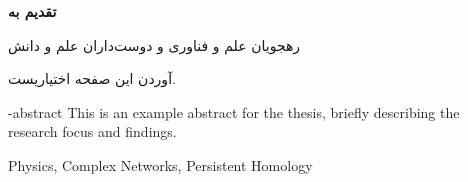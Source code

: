 \documentclass[msc]{style/SBU-Thesis}
\begin{document}
\rightsPage %
\copyRightPage %


{
	\newpage
	\thispagestyle{plain}
	\large{\textbf{تقدیم به}}
	
	\begin{center}
		رهجويان علم و فناوری و دوست‌داران علم و دانش
	\end{center}
	
	\vspace{14cm}	
	آوردن این صفحه اختیاریست.
	
	\pagebreak
}


\abstractPage

\tableofcontents 

\listoffigures \newpage 

\listoftables \newpage 

\prefacePage
		
{\baselineskip=1cm
}
\let\cleardoublepage\clearpage
{\baselineskip=1cm
}
\let\cleardoublepage\clearpage
{\baselineskip=1cm
}
\let\cleardoublepage\clearpage
{\baselineskip=1cm
}

\appendix

{\baselineskip=1cm

}

\newpage
\renewcommand{\bibname}{مراجع}



\en-abstract
{
This is an example abstract for the thesis, briefly describing the research focus and findings.
}

\latinkeywords
{
    Physics, Complex Networks, Persistent Homology
}

\latinAbstractPage 

\latinFirstPage 
\end{document}
